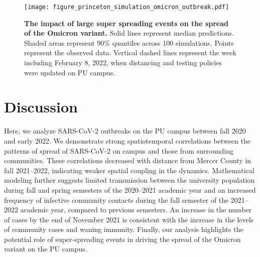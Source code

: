 \documentclass[12pt]{article}
\begin{document}
\begin{figure}[!thp]
\texttt{[image: figure\_princeton\_simulation\_omicron\_outbreak.pdf]}
\caption{
\textbf{The impact of large super spreading events on the spread of the Omicron variant.}
Solid lines represent median predictions.
Shaded areas represent 90\% quantiles across 100 simulations.
Points represent the observed data.
Vertical dashed lines represent the week including February 8, 2022, when distancing and testing policies were updated on PU campus.
}
\label{fig:omicron2}
\end{figure}

\section*{Discussion}

Here, we analyze SARS-CoV-2 outbreaks on the PU campus between fall 2020 and early 2022.
We demonstrate strong spatiotemporal correlations between the patterns of spread of SARS-CoV-2 on campus and those from surrounding communities.
These correlations decreased with distance from Mercer County in fall 2021--2022, indicating weaker spatial coupling in the dynamics.
Mathematical modeling further suggests limited transmission between the university population during fall and spring semesters of the 2020--2021 academic year and an increased frequency of infective community contacts during the fall semester of the 2021--2022 academic year, compared to previous semesters.
An increase in the number of cases by the end of November 2021 is consistent with the increase in the levels of community cases and waning immunity.
Finally, our analysis highlights the potential role of super-spreading events in driving the spread of the Omicron variant on the PU campus.
\end{document}
